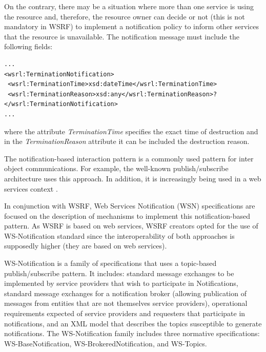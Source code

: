 On the contrary, there may be a situation where more than one service 
is using the resource and, therefore, the resource owner can decide or not 
(this is not mandatory in WSRF) to implement a notification policy
to inform other services that the resource is unavailable. The notification message must include the following fields: 

\begin{lstlisting}
...
<wsrl:TerminationNotification>
 <wsrl:TerminationTime>xsd:dateTime</wsrl:TerminationTime>
 <wsrl:TerminationReason>xsd:any</wsrl:TerminationReason>?
</wsrl:TerminationNotification>
...
\end{lstlisting}
where the attribute \emph{TerminationTime} specifies the exact time of destruction
and in the \emph{TerminationReason} attribute it can be included the destruction reason.

The notification-based interaction pattern is a commonly used pattern
for inter object communications. For example, the well-known
publish/subscribe architecture uses this approach. In addition, it is increasingly being
used in a web services context \cite{WSRFstandard}.

In conjunction with WSRF, Web Services Notification (WSN) specifications \cite{WSNstandard} are focused 
on the description of mechanisms to implement this notification-based pattern. 
As WSRF is based on web services, WSRF creators opted for the use
of WS-Notification standard since the interoperability of both approaches is supposedly higher (they
 are based on web services). 

WS-Notification is a family of specifications that uses a topic-based publish/subscribe
pattern. It includes: standard message exchanges to be implemented by service
providers that wish to participate in Notifications, standard message exchanges for a
notification broker (allowing publication of messages from entities that
are not themselves service providers), operational requirements expected of service providers 
and requesters that participate in notifications, and an XML model that
describes the topics susceptible to generate notifications. The WS-Notification family includes
three normative specifications:
WS-BaseNotification, WS-BrokeredNotification, and WS-Topics.

